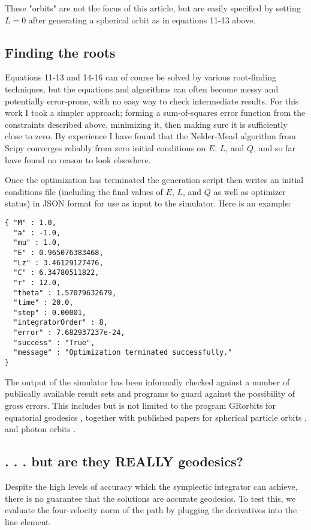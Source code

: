 \documentclass[11pt]{article}
\begin{document}
These "orbits" are not the focus of this article, but are easily specified by setting $L = 0$ after generating a spherical orbit as in equations 11-13 above.

\subsection{Finding the roots}

Equations 11-13 and 14-16 can of course be solved by various root-finding techniques, but the equations and algorithms can often become messy and potentially error-prone, with no easy way to check intermediate results.  For this work I took a simpler approach; forming a sum-of-squares error function from the constraints described above, minimizing it, then making sure it is sufficiently close to zero.  By experience I have found that the Nelder-Mead algorithm from Scipy converges reliably from zero initial conditions on $E$, $L$, and $Q$, and so far have found no reason to look elsewhere.

Once the optimization has terminated the generation script then writes an initial conditions file (including the final values of $E$, $L$, and $Q$ as well as optimizer status) in JSON format for use as input to the simulator.  Here is an example:

\begin{verbatim}
{ "M" : 1.0,
  "a" : -1.0,
  "mu" : 1.0,
  "E" : 0.965076383468,
  "Lz" : 3.46129127476,
  "C" : 6.34780511822,
  "r" : 12.0,
  "theta" : 1.57079632679,
  "time" : 20.0,
  "step" : 0.00001,
  "integratorOrder" : 8,
  "error" : 7.682937237e-24,
  "success" : "True",
  "message" : "Optimization terminated successfully."
}
\end{verbatim}

The output of the simulator has been informally checked against a number of publically available result sets and programs to guard against the possibility of gross errors.  This includes  but is not limited to the program GRorbits for equatorial geodesics \cite{grorbits}, together with published papers for spherical particle orbits \cite{teo}, and photon orbits \cite{kheng}.

\subsection{. . . but are they REALLY geodesics?}

Despite the high levels of accuracy which the symplectic integrator can achieve, there is no guarantee that the solutions are accurate geodesics.  To test this, we evaluate the four-velocity norm of the path by plugging the derivatives into the line element.
\end{document}
